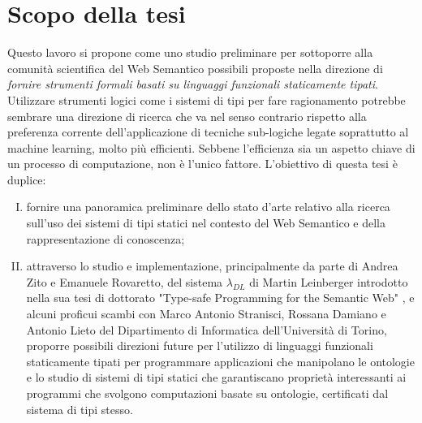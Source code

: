 \section{Scopo della tesi}
Questo lavoro si propone come uno studio preliminare per sottoporre alla comunità scientifica del Web Semantico possibili proposte nella direzione di \textit{fornire strumenti formali basati su linguaggi funzionali staticamente tipati}. Utilizzare strumenti logici come i sistemi di tipi per fare ragionamento potrebbe sembrare una direzione di ricerca che va nel senso contrario rispetto alla preferenza corrente dell'applicazione di tecniche sub-logiche legate soprattutto al machine learning, molto più efficienti. Sebbene l'efficienza sia un aspetto chiave di un processo di computazione, non è l'unico fattore.
L'obiettivo di questa tesi è duplice: 
\begin{enumerate}[I)]
	\item fornire una panoramica preliminare dello stato d'arte relativo alla ricerca sull'uso dei sistemi di tipi statici nel contesto del Web Semantico e della rappresentazione di conoscenza;
	\item  attraverso lo studio e implementazione, principalmente da parte di Andrea Zito e Emanuele Rovaretto, del sistema $\lambda_{DL}$ di Martin Leinberger introdotto nella sua tesi di dottorato "Type-safe Programming for the Semantic Web" \cite{leinbergerphdthesis}, e alcuni proficui scambi con Marco Antonio Stranisci, Rossana Damiano e Antonio Lieto del Dipartimento di Informatica dell’Università di Torino, proporre possibili direzioni future per l’utilizzo di linguaggi funzionali staticamente tipati per programmare applicazioni che manipolano le ontologie e lo studio di sistemi di tipi statici che garantiscano proprietà interessanti ai programmi che svolgono computazioni basate su ontologie, certificati dal sistema di tipi stesso.
\end{enumerate}
\newpage
\noindent
